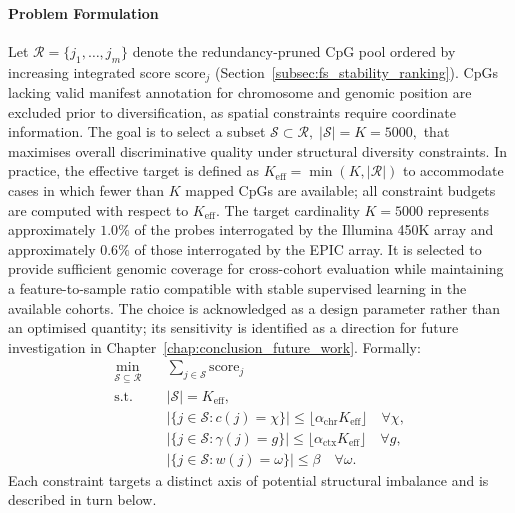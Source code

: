 \paragraph{Problem Formulation}

Let $\mathcal{R} = \{j_1, \dots, j_m\}$ denote the 
redundancy-pruned CpG pool ordered by increasing 
integrated score $\mathrm{score}_j$ 
(Section~\ref{subsec:fs_stability_ranking}).
CpGs lacking valid manifest annotation for chromosome and genomic position 
are excluded prior to diversification, as spatial constraints require 
coordinate information.
The goal is to select a subset
\(
\mathcal{S} \subset \mathcal{R},
\;
|\mathcal{S}| = K = 5000,
\)
that maximises overall discriminative quality under 
structural diversity constraints. In practice, the effective target is defined as 
$K_{\mathrm{eff}} = \min(K, |\mathcal{R}|)$ 
to accommodate cases in which fewer than $K$ mapped CpGs are available; 
all constraint budgets are computed with respect to $K_{\mathrm{eff}}$.
The target cardinality $K = 5000$ represents approximately 
$1.0\%$ of the probes interrogated by the Illumina 450K array 
and approximately $0.6\%$ of those interrogated by the EPIC array. 
It is selected to provide sufficient genomic coverage for 
cross-cohort evaluation while maintaining a feature-to-sample 
ratio compatible with stable supervised learning in the 
available cohorts. The choice is acknowledged as a design 
parameter rather than an optimised quantity; its sensitivity 
is identified as a direction for future investigation in 
Chapter~\ref{chap:conclusion_future_work}. %
Formally:
\begin{equation}
\label{eq:div_problem}
\begin{aligned}
\min_{\mathcal{S} \subseteq \mathcal{R}} 
\quad & \sum_{j \in \mathcal{S}} \mathrm{score}_j 
\\
\text{s.t.} \quad 
& |\mathcal{S}| = K_{\mathrm{eff}}, 
\\
& |\{ j \in \mathcal{S} : c(j)=\chi \}| 
  \leq \lfloor \alpha_{\mathrm{chr}} K_{\mathrm{eff}} \rfloor 
  \quad \forall \chi,
\\
& |\{ j \in \mathcal{S} : \gamma(j)=g \}| 
  \leq \lfloor \alpha_{\mathrm{ctx}} K_{\mathrm{eff}} \rfloor 
  \quad \forall g,
\\
& |\{ j \in \mathcal{S} : w(j)=\omega \}| 
  \leq \beta 
  \quad \forall \omega.
\end{aligned}
\end{equation}
Each constraint targets a distinct axis of potential 
structural imbalance and is described in turn below.

